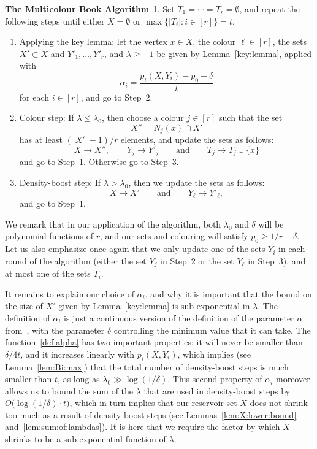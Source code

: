\documentclass[12pt,reqno]{amsart}
\theoremstyle{definition}
\newtheorem*{RBalg}{The Multicolour Book Algorithm}
\theoremstyle{remark}
\renewcommand{\le}{\leqslant}
\renewcommand{\ge}{\geqslant}
\renewcommand{\to}{\rightarrow}
\begin{document}
\begin{RBalg}
Set $T_1 = \cdots = T_r = \emptyset$, and repeat the following steps until either $X = \emptyset$ or $\max\big\{ |T_i| : i \in [r] \big\} = t$. 
\begin{enumerate}[label=\arabic*., ref=\arabic*] 
\item\label{Alg:Step1} Applying the key lemma: let the vertex $x \in X$, the colour $\ell \in [r]$, the sets $X' \subset X$ and $Y'_1,\ldots,Y'_r$, and $\lambda \ge -1$ be given by Lemma~\ref{key:lemma}, applied with
\begin{equation}\label{def:alpha}
\alpha_i = \frac{p_i(X,Y_i) - p_0 + \delta}{t}
\end{equation}
for each $i \in [r]$, and go to Step~2.\smallskip
\item\label{Alg:Step2} Colour step: If $\lambda \le \lambda_0$, then choose a colour $j \in [r]$ such that the set
$$X'' = N_j(x) \cap X'$$ 
has at least $(|X'| - 1)/r$ elements, and update the sets as follows:
$$X \to X'', \qquad Y_j \to Y'_j \qquad \text{and} \qquad T_j \to T_j \cup \{x\}$$
and go to Step~1. Otherwise go to Step~3.\smallskip
\item\label{Alg:Step3} Density-boost step: If $\lambda > \lambda_0$, then we update the sets as follows:
$$X \to X' \qquad \text{and} \qquad Y_\ell \to Y'_\ell,$$
and go to Step~1.
\end{enumerate}  
\end{RBalg} 

We remark that in our application of the algorithm, both $\lambda_0$ and $\delta$ will be polynomial functions of $r$, and our sets and colouring will satisfy $p_0 \ge 1/r - \delta$. Let us also emphasize once again that we only update one of the sets $Y_i$ in each round of the algorithm (either the set $Y_j$ in Step~2 or the set $Y_\ell$ in Step~3), and at most one of the sets $T_i$. 

It remains to explain our choice of $\alpha_i$, and why it is important that the bound on the size of $X'$ given by Lemma~\ref{key:lemma} is sub-exponential in $\lambda$. The definition of $\alpha_i$ is just a continuous version of the definition of the parameter $\alpha$ from~\cite{CGMS}, with the parameter $\delta$ controlling the minimum value that it can take. The function~\eqref{def:alpha} has two important properties: it will never be smaller than $\delta / 4t$, and it increases linearly with $p_i(X,Y_i)$, which implies (see Lemma~\ref{lem:Bi:max}) that the total number of density-boost steps is much smaller than $t$, as long as $\lambda_0 \gg \log(1/\delta)$. This second property of $\alpha_i$ moreover allows us to bound the sum of the $\lambda$ that are used in density-boost steps by $O\big( \log(1/\delta) \cdot t \big)$, which in turn implies that our reservoir set $X$ does not shrink too much as a result of density-boost steps (see Lemmas~\ref{lem:X:lower:bound} and~\ref{lem:sum:of:lambdas}). It is here that we require the factor by which $X$ shrinks to be a sub-exponential function of $\lambda$. 
\end{document}

